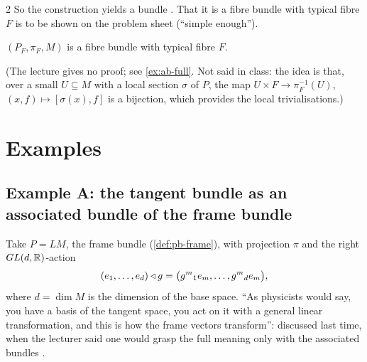 \begin{paracol}{2}
So the construction yields a bundle . That it is a fibre bundle with typical fibre $F$ is to be shown on the problem sheet (``simple enough'').
\begin{theorem}\label{thm:ab-bundle}
$(P_F,\pi_F,M)$ is a fibre bundle with typical fibre $F$.   
\end{theorem}
(The lecture gives no proof; see \cref{ex:ab-full}. Not said in class: the idea is that, over a small $U\subseteq M$ with a local section $\sigma$ of $P$, the map $U\times F\to\pi_F^{-1}(U)$, $(x,f)\mapsto[\sigma(x),f]$ is a bijection, which provides the local trivialisations.)

\section{Examples}\label{sec:ab-examples}

\subsection{Example A: the tangent bundle as an associated bundle of the frame bundle}\label{sec:ab-tangent}
Take $P=LM$, the frame bundle (\cref{def:pb-frame}), with projection $\pi$ and the right $GL(d,\mathbb{R})$-action
\[
  (e_1,\dots,e_d)\mathbin{\triangleleft} g=\bigl(g^m{}_1e_m,\dots,g^m{}_de_m\bigr),
\]
where $d=\dim M$ is the dimension of the base space. ``As physicists would say, you have a basis of the tangent space, you act on it with a general linear transformation, and this is how the frame vectors transform'': discussed last time, when the lecturer said one would grasp the full meaning only with the associated bundles        .


\end{paracol}
